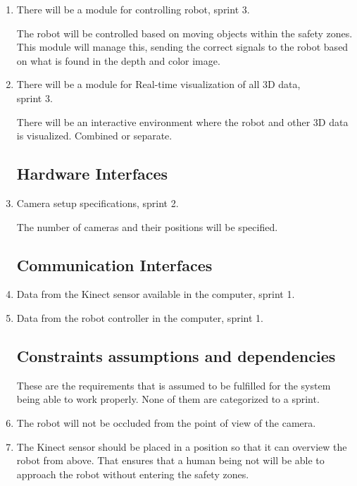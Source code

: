 \documentclass[10pt,a4paper]{article}
\begin{document}
\begin{enumerate}
\item There will be a module for controlling robot, sprint 3.

{\addtolength{\leftskip}{5mm}The robot will be controlled based on moving objects within the safety zones. This module will manage this, sending the correct signals to the robot based on what is found in the depth and color image.
\par}

\item There will be a module for Real-time visualization of all 3D data,\\ sprint 3.

{\addtolength{\leftskip}{5mm}There will be an interactive environment where the robot and other 3D data is visualized. Combined or separate.\par}

\subsection{Hardware Interfaces}

\item Camera setup specifications, sprint 2.

{\addtolength{\leftskip}{5mm} The number of cameras and their positions will be specified.\par}

\subsection{Communication Interfaces}

\item Data from the Kinect sensor available in the computer, sprint 1.
\item Data from the robot controller in the computer, sprint 1.

\subsection{Constraints assumptions and dependencies}
These are the requirements that is assumed to be fulfilled for the system being able to work properly. None of them are categorized to a sprint.

\item The robot will not be occluded from the point of view of the camera.

\item The Kinect sensor should be placed in a position so that it can overview the robot from above. That ensures that a human being not will be able to approach the robot without entering the safety zones.


\end{enumerate}
\end{document}
